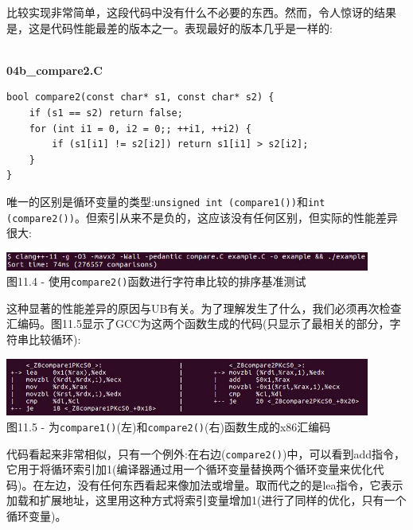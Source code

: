 比较实现非常简单，这段代码中没有什么不必要的东西。然而，令人惊讶的结果是，这是代码性能最差的版本之一。表现最好的版本几乎是一样的:

\hspace*{\fill} \\ %
\noindent
\textbf{04b\_compare2.C}
\begin{lstlisting}[style=styleCXX]
bool compare2(const char* s1, const char* s2) {
	if (s1 == s2) return false;
	for (int i1 = 0, i2 = 0;; ++i1, ++i2) {
		if (s1[i1] != s2[i2]) return s1[i1] > s2[i2];
	}
}
\end{lstlisting}

唯一的区别是循环变量的类型:\texttt{unsigned int (compare1())}和\texttt{int (compare2())}。但索引从来不是负的，这应该没有任何区别，但实际的性能差异很大:

\begin{center}
\includegraphics[width=0.9\textwidth]{content/3/chapter11/images/4.jpg}\\
图11.4 - 使用\texttt{compare2()}函数进行字符串比较的排序基准测试
\end{center}

这种显著的性能差异的原因与UB有关。为了理解发生了什么，我们必须再次检查汇编码。图11.5显示了GCC为这两个函数生成的代码(只显示了最相关的部分，字符串比较循环):

\begin{center}
\includegraphics[width=0.9\textwidth]{content/3/chapter11/images/5.jpg}\\
图11.5 - 为\texttt{compare1()}(左)和\texttt{compare2()}(右)函数生成的x86汇编码
\end{center}

代码看起来非常相似，只有一个例外:在右边(\texttt{compare2()})中，可以看到add指令，它用于将循环索引加1(编译器通过用一个循环变量替换两个循环变量来优化代码)。在左边，没有任何东西看起来像加法或增量。取而代之的是lea指令，它表示加载和扩展地址，这里用这种方式将索引变量增加1(进行了同样的优化，只有一个循环变量)。 

